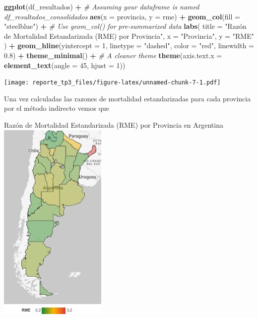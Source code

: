 \documentclass[
]{article}
\newenvironment{Shaded}{\begin{snugshade}}{\end{snugshade}}
\newcommand{\AttributeTok}[1]{\textcolor[rgb]{0.13,0.29,0.53}{#1}}
\newcommand{\CommentTok}[1]{\textcolor[rgb]{0.56,0.35,0.01}{\textit{#1}}}
\newcommand{\DecValTok}[1]{\textcolor[rgb]{0.00,0.00,0.81}{#1}}
\newcommand{\FloatTok}[1]{\textcolor[rgb]{0.00,0.00,0.81}{#1}}
\newcommand{\FunctionTok}[1]{\textcolor[rgb]{0.13,0.29,0.53}{\textbf{#1}}}
\newcommand{\NormalTok}[1]{#1}
\newcommand{\SpecialCharTok}[1]{\textcolor[rgb]{0.81,0.36,0.00}{\textbf{#1}}}
\newcommand{\StringTok}[1]{\textcolor[rgb]{0.31,0.60,0.02}{#1}}
\begin{document}
\begin{Shaded}
\begin{Highlighting}[]
\FunctionTok{ggplot}\NormalTok{(df\_resultados) }\SpecialCharTok{+} \CommentTok{\# Assuming your dataframe is named df\_resultados\_consolidados}
  \FunctionTok{aes}\NormalTok{(}\AttributeTok{x =}\NormalTok{ provincia, }\AttributeTok{y =}\NormalTok{ rme) }\SpecialCharTok{+}
  \FunctionTok{geom\_col}\NormalTok{(}\AttributeTok{fill =} \StringTok{"steelblue"}\NormalTok{) }\SpecialCharTok{+} \CommentTok{\# Use geom\_col() for pre{-}summarized data}
  \FunctionTok{labs}\NormalTok{(}
    \AttributeTok{title =} \StringTok{"Razón de Mortalidad Estandarizada (RME) por Provincia"}\NormalTok{,}
    \AttributeTok{x =} \StringTok{"Provincia"}\NormalTok{,}
    \AttributeTok{y =} \StringTok{"RME"}
\NormalTok{  ) }\SpecialCharTok{+}
  \FunctionTok{geom\_hline}\NormalTok{(}\AttributeTok{yintercept =} \DecValTok{1}\NormalTok{, }\AttributeTok{linetype =} \StringTok{"dashed"}\NormalTok{, }\AttributeTok{color =} \StringTok{"red"}\NormalTok{, }\AttributeTok{linewidth =} \FloatTok{0.8}\NormalTok{) }\SpecialCharTok{+}
  \FunctionTok{theme\_minimal}\NormalTok{() }\SpecialCharTok{+} \CommentTok{\# A cleaner theme}
  \FunctionTok{theme}\NormalTok{(}\AttributeTok{axis.text.x =} \FunctionTok{element\_text}\NormalTok{(}\AttributeTok{angle =} \DecValTok{45}\NormalTok{, }\AttributeTok{hjust =} \DecValTok{1}\NormalTok{))}
\end{Highlighting}
\end{Shaded}

\texttt{[image: reporte\_tp3\_files/figure-latex/unnamed-chunk-7-1.pdf]}

Una vez calculadas las razones de mortalidad estandarizadas para cada
provincia por el método indirecto vemos que

Razón de Mortalidad Estandarizada (RME) por Provincia en Argentina
\includegraphics{map_rme.jpeg}
\end{document}
